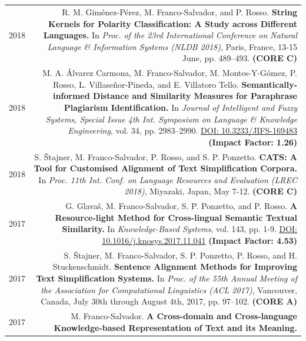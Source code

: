 \documentclass[10pt]{article}
\begin{document}
\section*{}
\begin{tabular}{L!{\VRule}R}
    2018& R. M. Gim{\'e}nez-P{\'e}rez, M. Franco-Salvador, and P. Rosso. \textbf{String Kernels for Polarity Classification: A Study across Different Languages.}
	In \emph{Proc. of the 23rd International Conference on Natural Language \& Information Systems (NLDB 2018)}, Paris, France, 13-15 June, pp. 489--493. \textbf{(CORE C)}\vspace{5pt}\\
	2018&M. A. {\'A}lvarez Carmona,  M. Franco-Salvador, M. Montes-Y-G{\'o}mez, P. Rosso, L. Villase{\~n}or-Pineda, and E. Villatoro Tello. \textbf{Semantically-informed Distance and Similarity Measures for Paraphrase Plagiarism Identification.}
	In \emph{Journal of Intelligent and Fuzzy Systems, Special Issue 4th Int. Symposium on Language \& Knowledge Engineering}, vol. 34, pp. 2983--2990. \href{https://doi.org/10.3233/JIFS-169483}{DOI: 10.3233/JIFS-169483} \textbf{(Impact Factor: 1.26)} \vspace{5pt}\\	
    2018 & S. \v{S}tajner, M. Franco-Salvador, P. Rosso, and S. P. Ponzetto. \textbf{CATS: A Tool for Customised Alignment of Text Simplification Corpora.} In \emph{Proc. 11th Int. Conf. on Language Resources and Evaluation (LREC 2018)}, Miyazaki, Japan, May 7-12. \textbf{(CORE C)} \vspace{5pt}\\
    2017 & G. Glava{\v s}, M. Franco-Salvador, S. P. Ponzetto, and P. Rosso. \textbf{A Resource-light Method for Cross-lingual Semantic Textual Similarity.}
	In \emph{Knowledge-Based Systems}, vol. 143, pp. 1-9. \href{https://doi.org/10.1016/j.knosys.2017.11.041}{DOI: 10.1016/j.knosys.2017.11.041} \textbf{(Impact Factor: 4.53)} \vspace{5pt}\\	
	2017& S. \v{S}tajner, M. Franco-Salvador, S. P. Ponzetto, P. Rosso, and H. Stuckenschmidt. \textbf{Sentence Alignment Methods for Improving Text Simplification Systems.}
	In \emph{Proc. of the 55th Annual Meeting of the Association for Computational Linguistics (ACL 2017)},  Vancouver, Canada, July 30th through August 4th, 2017, pp. 97--102. \textbf{(CORE A)}\vspace{5pt}\\
	2017& M. Franco-Salvador. \textbf{A Cross-domain and Cross-language Knowledge-based Representation of Text and its Meaning.}

\end{tabular}
\end{document}

